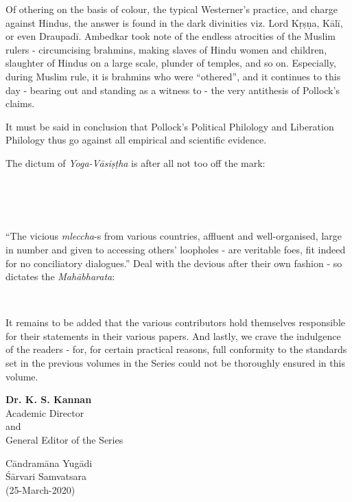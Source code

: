 \vspace {.15cm}

Of othering on the basis of colour, the typical Westerner’s practice, and charge against Hindus, the answer is found in the dark divinities viz. Lord Kṛṣṇa, Kālī, or even Draupadī. Ambedkar took note of the endless atrocities of the Muslim rulers - circumcising brahmins, making slaves of Hindu women and children, slaughter of Hindus on a large scale, plunder of temples, and so on. Especially, during Muslim rule, it is brahmins who were “othered”, and it continues to this day - bearing out and standing as a witness to - the very antithesis of Pollock’s claims.

It must be said in conclusion that Pollock’s Political Philology and Liberation Philology thus go against all empirical and scientific evidence.

The dictum of \textit{Yoga-Vāsiṣṭha} is after all not too off the mark:
\begin{center}
 \\\\ \\
\end{center}

“The vicious \textit{mleccha}-s from various countries, affluent and well-organised, large in number and given to accessing others’ loopholes - are veritable foes, fit indeed for no conciliatory dialogues.” Deal with the devious after their own fashion - so dictates the \textit{Mahābharata}:
\begin{center}
\\
\end{center}

It remains to be added that the various contributors hold themselves responsible for their statements in their various papers. And lastly, we crave the indulgence of the readers - for, for certain practical reasons, full conformity to the standards set in the previous volumes in the Series could not be thoroughly ensured in this volume.

\begin{flushright}
\textbf{Dr. K. S. Kannan}\\
Academic Director\\
and\\
General Editor of the Series\\
\end{flushright}

\begin{flushleft}
Cāndramāna Yugādi\\
Śārvari Samvatsara\\
(25-March-2020)
\end{flushleft}
